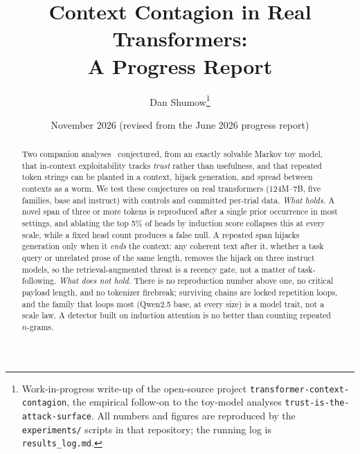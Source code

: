 \documentclass[11pt]{article}
\title{\bfseries Context Contagion in Real Transformers:\\[2pt]
A Progress Report}
\author{Dan Shumow\thanks{Work-in-progress write-up of the open-source project
\texttt{transformer-context-contagion}, the empirical follow-on to the toy-model analyses
\texttt{trust-is-the-attack-surface}. All numbers and figures are reproduced by the
\texttt{experiments/} scripts in that repository; the running log is \texttt{results\_log.md}.}}
\date{November 2026 (revised from the June 2026 progress report)}
\theoremstyle{plain}
\theoremstyle{definition}
\theoremstyle{remark}
\begin{document}
\maketitle

\begin{center}\small
{}
\end{center}

\begin{abstract}
Two companion analyses~\cite{shumow2026trust,shumow2026contagion} conjectured, from an exactly
solvable Markov toy model, that in-context exploitability tracks \emph{trust} rather than
usefulness, and that repeated token strings can be planted in a context, hijack generation, and
spread between contexts as a worm. We test these conjectures on real transformers (124M--7B,
five families, base and instruct) with controls and committed per-trial data.
\emph{What holds.} A novel span of three or more tokens is reproduced after a single prior
occurrence in most settings, and ablating the top 5\% of heads by induction score collapses
this at every scale, while a fixed head count produces a false null. A repeated span hijacks generation only when it \emph{ends} the context: any
coherent text after it, whether a task query or unrelated prose of the same length, removes the
hijack on three instruct models, so the retrieval-augmented threat is a recency gate, not a
matter of task-following. \emph{What does not hold.} There is no reproduction number above one,
no critical payload length, and no tokenizer firebreak; surviving chains are locked repetition
loops, and the family that loops most (Qwen2.5 base, at every size) is a model trait, not a
scale law. A detector built on induction attention is no better than counting repeated
$n$-grams.
\end{abstract}
\end{document}
